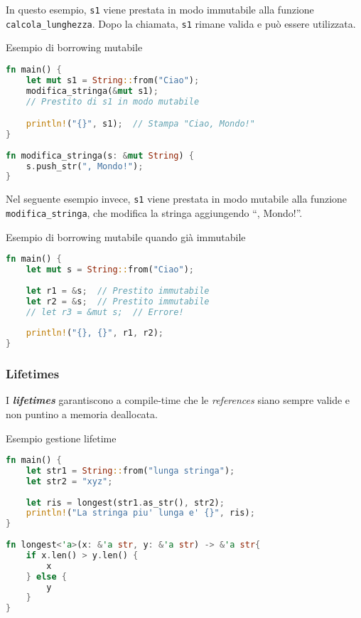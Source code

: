 In questo esempio, \texttt{s1} viene prestata in modo immutabile alla funzione \texttt{calcola\_lunghezza}. Dopo la chiamata, \texttt{s1} rimane valida e può essere utilizzata.

\begin{algorithm}[ht]
    \caption{Esempio di borrowing mutabile}
    \label{lst:borrowing_mutabile}
    \begin{lstlisting}[language=Rust, style=colouredRust]
fn main() {
    let mut s1 = String::from("Ciao");
    modifica_stringa(&mut s1);  
    // Prestito di s1 in modo mutabile

    println!("{}", s1);  // Stampa "Ciao, Mondo!"
}
        
fn modifica_stringa(s: &mut String) {
    s.push_str(", Mondo!");
}
\end{lstlisting}
\end{algorithm}

Nel seguente esempio invece, \texttt{s1} viene prestata in modo mutabile alla funzione \texttt{modifica\_stringa}, che modifica la stringa aggiungendo ``, Mondo!''.
~\\
\begin{algorithm}[ht]
    \caption{Esempio di borrowing mutabile quando già immutabile}
    \label{lst:borrowing_mutabile_e_immutabile}
    \begin{lstlisting}[language=Rust, style=colouredRust]
fn main() {
    let mut s = String::from("Ciao");
        
    let r1 = &s;  // Prestito immutabile
    let r2 = &s;  // Prestito immutabile
    // let r3 = &mut s;  // Errore!
        
    println!("{}, {}", r1, r2);
}
\end{lstlisting}
\end{algorithm}


\subsubsection{Lifetimes}

I \textbf{\textit{lifetimes}} garantiscono a compile-time che le \textit{references} siano sempre valide e non puntino a memoria deallocata.

\begin{algorithm}[ht]
    \caption{Esempio gestione lifetime}
    \label{lst:lifetimes}
\begin{lstlisting}[language=Rust, style=colouredRust]
fn main() {
    let str1 = String::from("lunga stringa");
    let str2 = "xyz";
    
    let ris = longest(str1.as_str(), str2);
    println!("La stringa piu' lunga e' {}", ris);
}
    
fn longest<'a>(x: &'a str, y: &'a str) -> &'a str{
    if x.len() > y.len() {
        x
    } else {
        y
    }
}
\end{lstlisting}
\end{algorithm}

